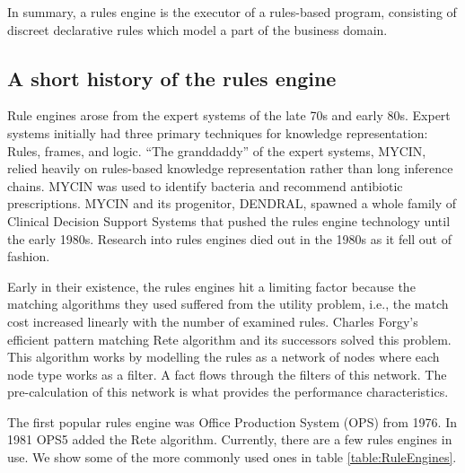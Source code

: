 In summary, a rules engine is the executor of a rules-based program, consisting of discreet declarative rules which model a part of the business domain.

\subsection{A short history of the rules engine}
\label{section:rules_engine_history}

Rule engines arose from the expert systems of the late 70s and early 80s.
Expert systems initially had three primary techniques for knowledge representation: Rules, frames, and logic\cite{jackson1986introduction}.
``The granddaddy'' of the expert systems, MYCIN, relied heavily on rules-based knowledge representation\cite{shortliffe1974mycin} rather than long inference chains.
MYCIN was used to identify bacteria and recommend antibiotic prescriptions.
MYCIN and its progenitor, DENDRAL, spawned a whole family of Clinical Decision Support Systems that pushed the rules engine technology until the early 1980s.
Research into rules engines died out in the 1980s as it fell out of fashion.

Early in their existence, the rules engines hit a limiting factor because the matching algorithms they used suffered from the utility problem, i.e., the match cost increased linearly with the number of examined rules.
Charles Forgy's efficient pattern matching Rete algorithm\cite{forgy1989rete} and its successors solved this problem.
This algorithm works by modelling the rules as a network of nodes where each node type works as a filter.
A fact flows through the filters of this network.
The pre-calculation of this network is what provides the performance characteristics.

The first popular rules engine was Office Production System (OPS) from 1976.
In 1981 OPS5 added the Rete algorithm.
Currently, there are a few rules engines in use.
We show some of the more commonly used ones in table \ref{table:RuleEngines}.

